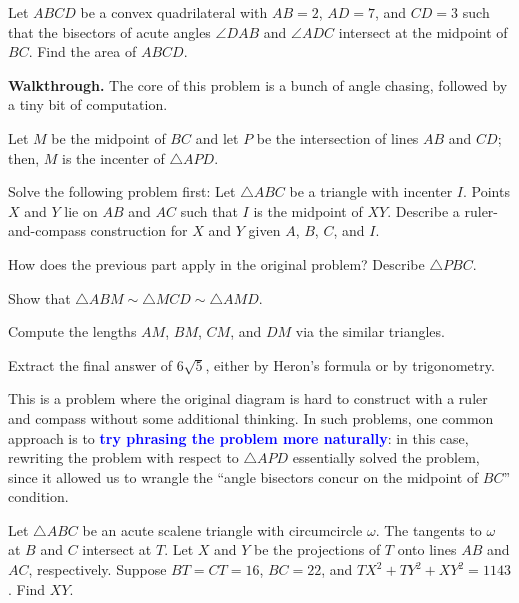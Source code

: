 \documentclass{scrartcl}
\providecommand{\ii}{\item}
\providecommand{\alert}[1]{{\sffamily\textbf{\textcolor{blue}{#1}}}}
\newenvironment{walkthrough}{\noindent\textbf{Walkthrough.}}{}
\begin{document}
\begin{example}[2022 AIME II/11]
	Let $ABCD$ be a convex quadrilateral with $AB = 2$, $AD = 7$, and $CD = 3$
	such that the bisectors of acute angles $\angle DAB$ and $\angle ADC$
	intersect at the midpoint of $BC$. Find the area of $ABCD$.
\end{example}
\begin{walkthrough}
	The core of this problem is a bunch of angle chasing, followed by
	a tiny bit of computation.
	
	Let $M$ be the midpoint of $BC$ and let $P$ be the intersection of
	lines $AB$ and $CD$; then, $M$ is the incenter of $\triangle APD$.
	\begin{walk}
		\ii Solve the following problem first: Let $\triangle ABC$ be
		a triangle with incenter $I$. Points $X$ and $Y$ lie on $AB$ and $AC$
		such that $I$ is the midpoint of $XY$. Describe a ruler-and-compass
		construction for $X$ and $Y$ given $A$, $B$, $C$, and $I$.
		\ii How does the previous part apply in the original problem?
		Describe $\triangle PBC$.
		\ii Show that
		$\triangle ABM\sim\triangle MCD\sim\triangle AMD$.
		\ii Compute the lengths $AM$, $BM$, $CM$, and $DM$
		via the similar triangles.
		\ii Extract the final answer of $6\sqrt5$, either by Heron's formula
		or by trigonometry.
	\end{walk}
	This is a problem where the original diagram is hard to construct
	with a ruler and compass without some additional thinking.
	In such problems, one common approach is to
	\alert{try phrasing the problem more naturally}:
	in this case, rewriting the problem with respect to
	$\triangle APD$ essentially solved the problem, since it allowed us
	to wrangle the ``angle bisectors concur on the midpoint of $BC$'' condition.
\end{walkthrough}

\begin{example}[2020 AIME II/15]
	Let $\triangle ABC$ be an acute scalene triangle with circumcircle $\omega$.
	The tangents to $\omega$ at $B$ and $C$ intersect at $T$.
	Let $X$ and $Y$ be the projections of $T$ onto lines $AB$ and $AC$,
	respectively.
	Suppose $BT = CT = 16$, $BC = 22$, and $TX^2 + TY^2 + XY^2 = 1143$.
	Find $XY$.
\end{example}
\end{document}
